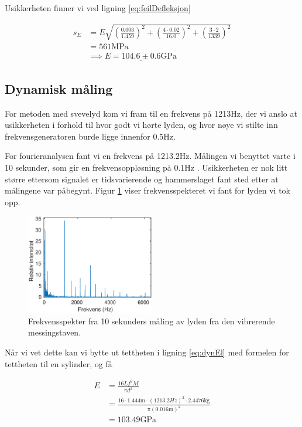 \documentclass[a4paper,11pt, twocolumn]{article}
\begin{document}
Usikkerheten finner vi ved ligning \eqref{eq:feilDefleksjon}

\begin{align}
	s_E &= E\sqrt{\left(\frac{0.003}{1.459}\right)^2+\left(\frac{4\cdot0.02}{16.0}\right)^2+\left(\frac{3\cdot 2}{1339}\right)^2}\\
	&= 561\text{MPa}\\
	&\implies \underline{E = 104.6\pm0.6\text{GPa}}
\end{align}


\subsection{Dynamisk måling}
For metoden med svevelyd kom vi fram til en frekvens på 1213Hz, der vi anslo at usikkerheten i forhold til hvor godt vi hørte lyden, og hvor nøye vi stilte inn frekvensgeneratoren burde ligge innenfor 0.5Hz. 

For fourieranalysen fant vi en frekvens på 1213.2Hz. Målingen vi benyttet varte i 10 sekunder, som gir en frekvensoppløsning på 0.1Hz \cite{vistnes4}. Usikkerheten er nok litt større ettersom signalet er tidsvarierende og hammerslaget fant sted etter at målingene var påbegynt. Figur \ref{fig:frekvensspekter} viser frekvensspekteret vi fant for lyden vi tok opp.

\begin{figure}[!ht]
	\includegraphics[width = 0.5\textwidth]{matlab/frekvensspekter.eps}
	\caption{Frekvensspekter fra 10 sekunders måling av lyden fra den vibrerende messingstaven.}
	\label{fig:frekvensspekter}
\end{figure}

Når vi vet dette kan vi bytte ut tettheten i ligning \eqref{eq:dynEl} med formelen for tettheten til en sylinder, og få

\begin{align}
	E &= \frac{16Lf^2M}{\pi d^2}\\
	&=\frac{16\cdot 1.444\text{m}\cdot(1213.2Hz)^2\cdot2.4476\text{kg}}{\pi (0.016\text{m})^2}\\
	&= 103.49\text{GPa}
\end{align}
\end{document}
